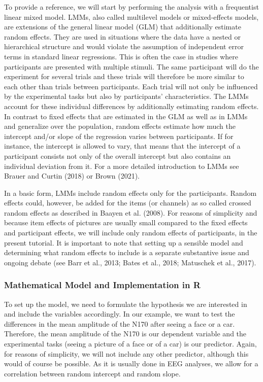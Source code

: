\documentclass[
  doc,12pt,floatsintext]{apa7}
\begin{document}
To provide a reference, we will start by performing the analysis with a frequentist linear mixed model. LMMs, also called multilevel models or mixed-effects models, are extensions of the general linear model (GLM) that additionally estimate random effects. They are used in situations where the data have a nested or hierarchical structure and would violate the assumption of independent error terms in standard linear regressions. This is often the case in studies where participants are presented with multiple stimuli. The same participant will do the experiment for several trials and these trials will therefore be more similar to each other than trials between participants. Each trial will not only be influenced by the experimental tasks but also by participants' characteristics. The LMMs account for these individual differences by additionally estimating random effects. In contrast to fixed effects that are estimated in the GLM as well as in LMMs and generalize over the population, random effects estimate how much the intercept and/or slope of the regression varies between participants. If for instance, the intercept is allowed to vary, that means that the intercept of a participant consists not only of the overall intercept but also contains an individual deviation from it. For a more detailed introduction to LMMs see Brauer and Curtin (2018) or Brown (2021).

In a basic form, LMMs include random effects only for the participants. Random effects could, however, be added for the items (or channels) as so called crossed random effects as described in Baayen et al. (2008). For reasons of simplicity and because item effects of pictures are usually small compared to the fixed effects and participant effects, we will include only random effects of participants, in the present tutorial. It is important to note that setting up a sensible model and determining what random effects to include is a separate substantive issue and ongoing debate (see Barr et al., 2013; Bates et al., 2018; Matuschek et al., 2017).

\subsubsection{Mathematical Model and Implementation in R}\label{mathematical-model-and-implementation-in-r}

To set up the model, we need to formulate the hypothesis we are interested in and include the variables accordingly. In our example, we want to test the differences in the mean amplitude of the N170 after seeing a face or a car. Therefore, the mean amplitude of the N170 is our dependent variable and the experimental tasks (seeing a picture of a face or of a car) is our predictor. Again, for reasons of simplicity, we will not include any other predictor, although this would of course be possible. As it is usually done in EEG analyses, we allow for a correlation between random intercept and random slope.
\end{document}
